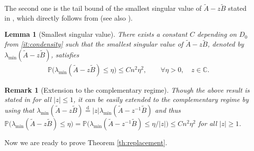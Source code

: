 \documentclass[10pt,reqno]{amsart}
\numberwithin{equation}{section}
\numberwithin{figure}{section}
\theoremstyle{plain}
\newtheorem{lemma}[theorem]{Lemma}
\newtheorem{remark}[theorem]{Remark}
\newcommand{\C}{{\mathbb{C}}}
\newcommand{\A}{{\tilde{A}}}
\newcommand{\B}{{\tilde{B}}}
\newcommand{\<}{\langle}
\renewcommand{\>}{\rangle}
\begin{document}
     The second one is the tail bound of the smallest singular value of $\A-z\B$ stated in \cite[Eq. (4.24)]{chafai-garcia-zelada-xu}, which directly follows from \cite[Lemma 3.4]{Davies} (see also \cite{invert,wegner}).
\begin{lemma}[Smallest singular value]\label{lemma_tail}
    There exists a constant $C$ depending on $D_0$ from \ref{it:condensity} such that the smallest singular value of $\A-z\B$, denoted by $\lambda_{\min}(\A-z\B)$,  satisfies
	\begin{align}\label{eq:tail_estimate}
		\mathbb{P} \Big(\lambda_{\min}(\A-z\B) \leq \eta \Big) \leq C n^2 \eta^2, \qquad \forall \eta>0,\quad z\in \C.
	\end{align}
\end{lemma}
\begin{remark}[Extension to the complementary regime]
   Though the above result is stated in \cite{chafai-garcia-zelada-xu} for all $|z|\leq 1$, it can be easily extended to the complementary regime by using that  $\lambda_{\min}(\A-z\B) \overset{\mathrm{d}}{=} |z|\lambda_{\min}(\A-z^{-1}\B) $ and thus $\mathbb{P} \big(\lambda_{\min}(\A-z\B) \leq \eta \big) = \mathbb{P} \big(\lambda_{\min} (\A-z^{-1}\B) \leq \eta/|z| \big) \leq C n^2 \eta^2$ for all $|z|\geq 1$. 
\end{remark}

     

Now we are ready to prove Theorem \ref{th:replacement}.
\end{document}
